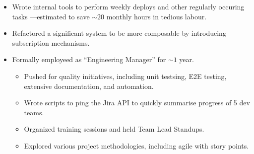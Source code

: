 \documentclass[letterpaper]{twentysecondcv} %
\begin{document}
\begin{twenty}
{\begin{itemize}[leftmargin=*]
      
      
      

    \item %
      Wrote internal tools to perform weekly deploys and other regularly occuring tasks
      ---estimated to save $\sim\!20$ monthly hours in tedious labour.

    \item Refactored a significant system to be more composable by introducing subscription mechanisms.
      
    \item Formally employeed as ``Engineering Manager'' for $\sim\!1$ year.
      \begin{itemize}
      \item Pushed for quality initiatives, including unit testsing, E2E testing, extensive documentation, and automation.
      \item Wrote scripts to ping the Jira API to quickly summarise progress of 5 dev teams.
      \item Organized training sessions and held Team Lead Standups.        
      \item Explored various project methodologies, including agile with story points.
      \end{itemize}
    \end{itemize}
     \room
  }


\end{twenty}
\end{document}
